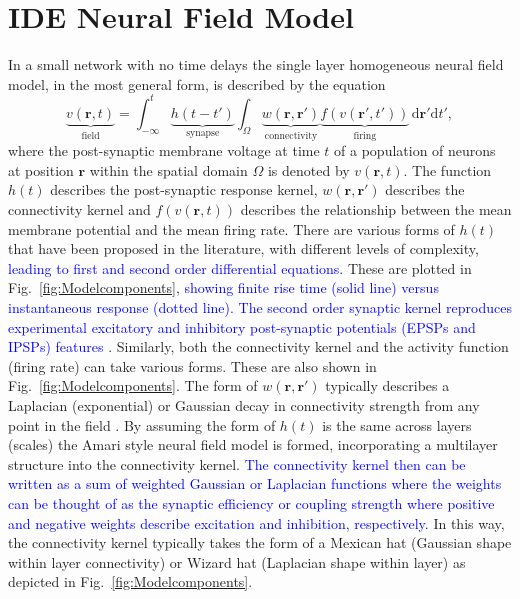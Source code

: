 \documentclass[review,authoryear,3p]{elsarticle}
\newcommand{\parham}[1]{\textcolor{blue}{#1}}
\begin{document}
\section{IDE Neural Field Model}
In a small network with no time delays the single layer homogeneous neural field model, in the most general form, is described by the equation
\begin{equation}
	\label{FullDoubleIntModel} \underbrace{v\left(\mathbf{r},t\right)}_{\text{field}} =
	\int_{-\infty}^t 
	\underbrace{h\left(t - t'\right)}_{\text{synapse}} \int_\Omega
	\underbrace{w\left(\mathbf{r},\mathbf{r}'\right)}_{\text{connectivity}} 
	\underbrace{f\left( v\left( \mathbf{r}',t'\right)\right)}_{\text{firing}}
	\, \mathrm{d}\mathbf{r}'\mathrm{d}t',
\end{equation}
where the post-synaptic membrane voltage at time $t$ of a population of neurons at position $\mathbf r$ within the spatial domain $\Omega$ is denoted by $v\left(\mathbf r,t\right)$. The function $h(t)$ describes the post-synaptic response kernel, $w\left(\mathbf{r},\mathbf{r}'\right)$ describes the connectivity kernel and $f(v(\mathbf{r},t))$ describes the relationship between the mean membrane potential and the mean firing rate. There are various forms of $h(t)$ that have been proposed in the literature, with different levels of complexity, \parham{leading to first and second order differential equations}. These are plotted in Fig.~\ref{fig:Modelcomponents}, \parham{showing finite rise time (solid line) versus instantaneous response (dotted line). The second order synaptic kernel reproduces  experimental excitatory and  inhibitory post-synaptic potentials (EPSPs and IPSPs) features \cite{VanRotterdam1982}}. Similarly, both the connectivity kernel and the activity function (firing rate) can take various forms. These are also shown in Fig.~\ref{fig:Modelcomponents}. The form of $w(\mathbf{r},\mathbf{r}')$ typically describes a Laplacian (exponential) or Gaussian decay in connectivity strength from any point in the field \cite{Breakspear2010,Atay2005}. By assuming the form of $h(t)$ is the same across layers (scales) the Amari style neural field model is formed, incorporating a multilayer structure into the connectivity kernel. \parham{The connectivity kernel then can be written as a sum of weighted Gaussian or Laplacian functions where the weights can be thought of as the synaptic efficiency or coupling strength where positive and negative weights describe excitation and inhibition, respectively.} In this way, the connectivity kernel typically takes the form of a Mexican hat (Gaussian shape within layer connectivity) or Wizard hat (Laplacian shape within layer) as depicted in Fig.~\ref{fig:Modelcomponents}.
\end{document}
